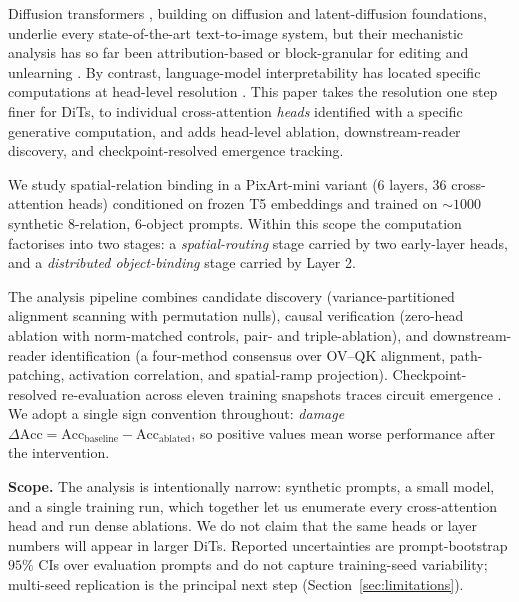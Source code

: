 \documentclass{article}
\theoremstyle{plain}
\theoremstyle{definition}
\begin{document}
Diffusion transformers \citep{peebles2023scalable,chen2024pixart}, building on diffusion \citep{ho2020denoising} and latent-diffusion \citep{rombach2022high} foundations, underlie every state-of-the-art text-to-image system, but their mechanistic analysis has so far been attribution-based \citep{helbling2025conceptattention,tang2023daam} or block-granular for editing and unlearning \citep{zarei2025localizing,basu2024localizing,orgad2023editing}. By contrast, language-model interpretability has located specific computations at head-level resolution \citep{wang2023interpretability,olsson2022induction,conmy2023acdc}. This paper takes the resolution one step finer for DiTs, to individual cross-attention \emph{heads} identified with a specific generative computation, and adds head-level ablation, downstream-reader discovery, and checkpoint-resolved emergence tracking.

We study spatial-relation binding in a PixArt-mini variant (6 layers, 36 cross-attention heads) conditioned on frozen T5 embeddings and trained on $\sim\!1000$ synthetic 8-relation, 6-object prompts. Within this scope the computation factorises into two stages: a \emph{spatial-routing} stage carried by two early-layer heads, and a \emph{distributed object-binding} stage carried by Layer 2.

The analysis pipeline combines candidate discovery (variance-partitioned alignment scanning with permutation nulls), causal verification (zero-head ablation with norm-matched controls, pair- and triple-ablation), and downstream-reader identification (a four-method consensus over OV--QK alignment, path-patching, activation correlation, and spatial-ramp projection). Checkpoint-resolved re-evaluation across eleven training snapshots traces circuit emergence \citep{nanda2023progress,olsson2022induction,power2022grokking}. We adopt a single sign convention throughout: \emph{damage} $\Delta\mathrm{Acc} = \mathrm{Acc}_{\mathrm{baseline}} - \mathrm{Acc}_{\mathrm{ablated}}$, so positive values mean worse performance after the intervention.

\textbf{Scope.} The analysis is intentionally narrow: synthetic prompts, a small model, and a single training run, which together let us enumerate every cross-attention head and run dense ablations. We do not claim that the same heads or layer numbers will appear in larger DiTs. Reported uncertainties are prompt-bootstrap $95\%$ CIs over evaluation prompts and do not capture training-seed variability; multi-seed replication is the principal next step (Section~\ref{sec:limitations}).
\end{document}
